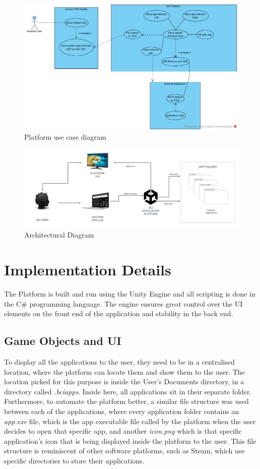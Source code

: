 \begin{figure}[H]
  \centering
  \includegraphics[width=1\textwidth]{Diagrams/Use Case/Platform.jpg}
  \caption{Platform use case diagram}
\end{figure}
\begin{figure}[H]
  \centering
  \includegraphics[width=1\textwidth]{Diagrams/Platform Architectural.png}
  \caption{Architectural Diagram}
\end{figure}


\section{Implementation Details}
The Platform is built and run using the Unity Engine and all scripting is done in the C\# programming language. The engine ensures great control over the UI elements on the front end of the application and stability in the back end.

\subsection{Game Objects and UI}
 To display all the applications to the user, they need to be in a centralised location, where the platform can locate them and show them to the user. The location picked for this purpose is inside the User's Documents directory, in a directory called \textit{.bciapps}. Inside here, all applications sit in their separate folder. Furthermore, to automate the platform better, a similar file structure was used between each of the applications, where every application folder contains an \textit{app.exe} file, which is the app executable file called by the platform when the user decides to open that specific app, and another \textit{icon.png} which is that specific application's icon that is being displayed inside the platform to the user. This file structure is reminiscent of other software platforms, such as Steam, which use specific directories to store their applications.
